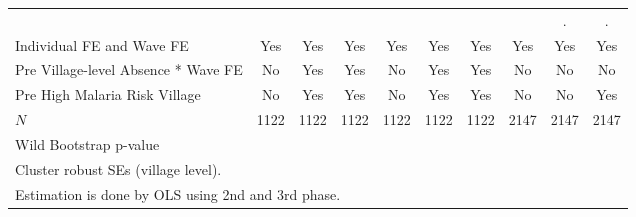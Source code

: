 {\begin{tabular}{l*{9}{c}}
            &                     &                     &                     &                     &                     &                     &                     &           .         &           .         \\
Individual FE and Wave FE &         Yes         &         Yes         &         Yes         &         Yes         &         Yes         &         Yes         &         Yes         &         Yes         &         Yes         \\
Pre Village-level Absence * Wave FE&          No         &         Yes         &         Yes         &          No         &         Yes         &         Yes         &          No         &          No         &          No         \\
Pre High Malaria Risk Village &          No         &         Yes         &         Yes         &          No         &         Yes         &         Yes         &          No         &          No         &         Yes         \\
\hline
\(N\)       &        1122         &        1122         &        1122         &        1122         &        1122         &        1122         &        2147         &        2147         &        2147         \\
Wild Bootstrap p-value &                     &                     &                     &                     &                     &                     &                     &                     &                     \\
\hline\hline
\multicolumn{10}{l}{\footnotesize Cluster robust SEs (village level).}\\
\multicolumn{10}{l}{\footnotesize Estimation is done by OLS using 2nd and 3rd phase.}\\
\end{tabular}
}
